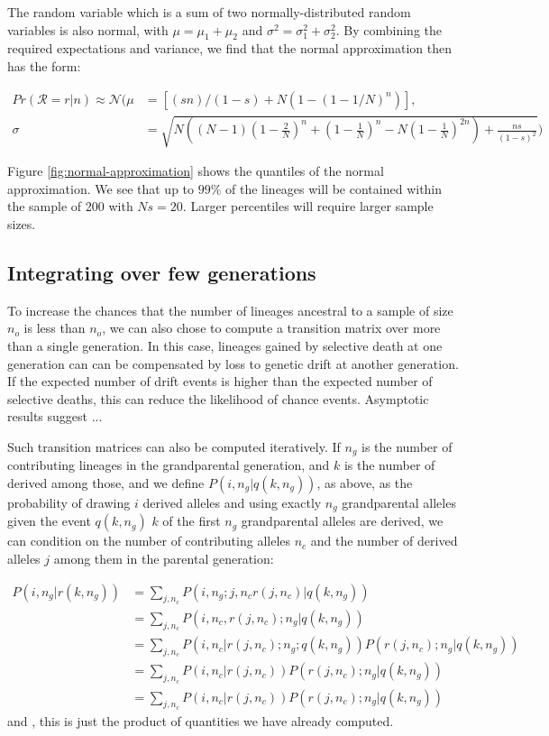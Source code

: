 \documentclass[review]{elsarticle}
\newcommand{\sgcomment}[1]{{\color{red}{SG: #1}}}
\begin{document}
The random variable which is a sum of two normally-distributed random variables is also normal, with
$\mu=\mu_1+\mu_2$ and $\sigma^2 = \sigma^2_1 + \sigma^2_2$. By combining the required expectations
and variance, we find that the normal approximation then has the form:

\begin{align}
  \label{eq:normal-approximation}
  Pr(\mathcal{R}=r|n) \approx \mathcal{N}( \mu &= \left[(s n)/(1 - s) + N (1 - (1 - 1/N)^n)\right],\\
  \sigma &= \sqrt{N \left((N-1) \left(1-\frac{2}{N}\right)^n+\left(1-\frac{1}{N}\right)^n-N\left(1-\frac{1}{N}\right)^{2 n}\right)+\frac{n s}{(1-s)^2}})
\end{align}

Figure \ref{fig:normal-approximation} shows the quantiles of the normal approximation. We see that
up to $99\%$ of the lineages will be contained within the sample of 200 with $Ns=20$. Larger
percentiles will require larger sample sizes.

\subsection
{Integrating over few generations} 
To increase the chances that the number of lineages ancestral to a sample 
of size $n_o$ is less than $n_o$, we can also chose to compute a transition matrix over more 
than a single generation. In this case, lineages gained by selective death at one generation can 
can be compensated by loss to genetic drift at another generation. If the expected number of 
drift events is higher than the expected number of selective deaths, this can reduce the likelihood 
of chance events. Asymptotic results suggest ... 

Such transition matrices can also be computed iteratively. If  $n_g$ is the number of contributing 
lineages in the grandparental generation, and $k$ is the number of derived among those, and we define 
 $P(i, n_g | q(k, n_g))$, as above, as the probability of drawing $i$ derived alleles and using exactly $n_g$
 grandparental alleles given the event $q(k, n_g)$ $k$ of the first $n_g$ grandparental alleles are derived, we can 
 condition on the number of contributing alleles $n_c$ and the number of derived alleles $j$ among them in the parental generation:
 
 \begin{equation}
 \begin{split}
 P(i, n_g | r(k, n_g)) & = \sum_{j,n_c} P(i, n_g ; j, n_c r(j,n_c)  | q(k, n_g))\\
 &= \sum_{j,n_c} P(i, n_c,  r(j,n_c); n_g  | q(k, n_g))\\
 &= \sum_{j,n_c} P(i, n_c|   r(j,n_c); n_g  ; q(k, n_g))  P(r(j,n_c); n_g  | q(k, n_g))\\
 &= \sum_{j,n_c} P(i, n_c |   r(j,n_c))  P( r(j,n_c); n_g  | q(k, n_g))\\
 &= \sum_{j,n_c} P(i, n_c |   r(j,n_c))  P( r(j,n_c); n_g  | q(k, n_g))
 \end{split}
\end{equation}
and \sgcomment{despite the crap notation}, this is just the product of quantities we have already computed.
\end{document}
